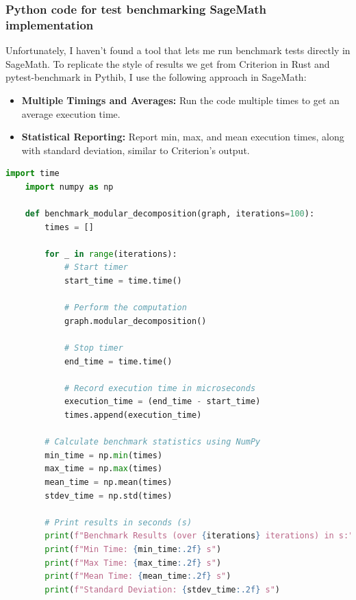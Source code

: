 

\subsubsection{Python code for test benchmarking SageMath implementation}

Unfortunately, I haven't found a tool that lets me run benchmark tests directly in SageMath.
To replicate the style of results we get from Criterion in Rust and pytest-benchmark in Pythib, I use the following approach in SageMath:
\begin{itemize}
    \item \textbf{Multiple Timings and Averages:} Run the code multiple times to get an average execution time.
    \item \textbf{Statistical Reporting:} Report min, max, and mean execution times, along with standard deviation, similar to Criterion’s output.
\end{itemize}

\begin{myex}

\end{myex}

\begin{lstlisting}[language=Python, style=python, caption={Example of benchmark code for modular decomposition}, label={lst:sagemath-example-of-benchmark-code}, firstnumber=1]
    import time
    import numpy as np

    def benchmark_modular_decomposition(graph, iterations=100):
        times = []

        for _ in range(iterations):
            # Start timer
            start_time = time.time()

            # Perform the computation
            graph.modular_decomposition()

            # Stop timer
            end_time = time.time()

            # Record execution time in microseconds
            execution_time = (end_time - start_time)
            times.append(execution_time)

        # Calculate benchmark statistics using NumPy
        min_time = np.min(times)
        max_time = np.max(times)
        mean_time = np.mean(times)
        stdev_time = np.std(times)

        # Print results in seconds (s)
        print(f"Benchmark Results (over {iterations} iterations) in s:")
        print(f"Min Time: {min_time:.2f} s")
        print(f"Max Time: {max_time:.2f} s")
        print(f"Mean Time: {mean_time:.2f} s")
        print(f"Standard Deviation: {stdev_time:.2f} s")
\end{lstlisting}


